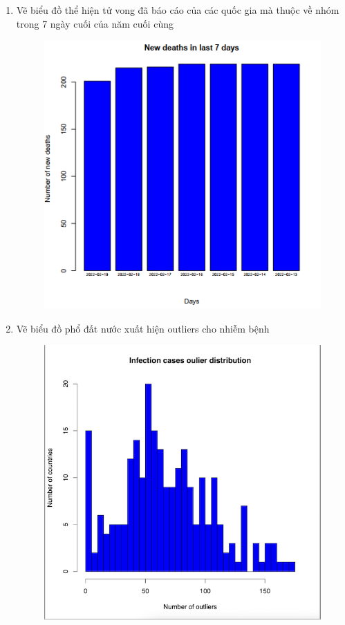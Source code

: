 \documentclass[a4paper]{article}
\theoremstyle{definition}
\begin{document}
\begin{enumerate}[i)]
\begin{enumerate}[1]
\begin{figure}[H]
			\end{figure}
			\item Vẽ biểu đồ thể hiện tử vong đã báo cáo của các quốc gia  mà thuộc về nhóm trong 7 ngày cuối của năm cuối cùng
			\begin{figure}[H]
				\centering
				\includegraphics[scale=0.8]{images/4.4.png}
			\end{figure}
			\item Vẽ biểu đồ phổ đất nước xuất hiện outliers cho nhiễm bệnh
			\begin{figure}[H]
				\centering
				\includegraphics[scale=0.8]{images/4.5.png}

\end{figure}
\end{enumerate}
\end{enumerate}
\end{document}
